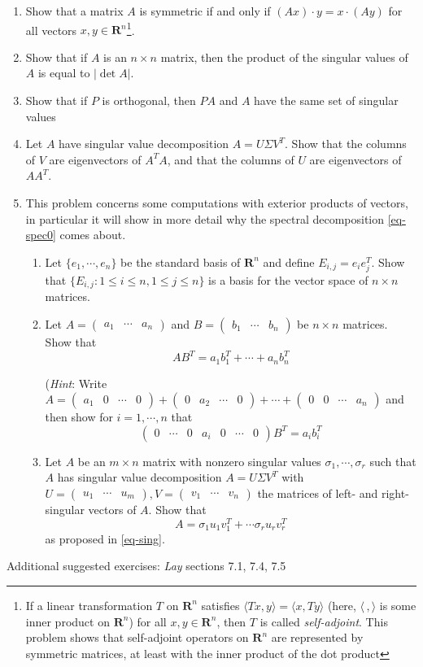 \documentclass[12pt]{article}
\numberwithin{equation}{subsection}
\numberwithin{figure}{subsection}
\theoremstyle{note}
\newcommand{\R}{\mathbf{R}}
\newcommand\ip[2]{\langle #1, #2\rangle}
\newcommand\m[1]{\begin{pmatrix}#1\end{pmatrix}}
\begin{document}
\begin{enumerate}[label=\arabic*.]
\begin{enumerate}
\end{enumerate}

\item Show that a matrix $A$ is symmetric if and only if $(Ax)\cdot y=x\cdot (Ay)$ for all vectors $x,y\in \R^n$\footnote{If a linear transformation $T$ on $\R^n$ satisfies $\langle Tx,y\rangle=\langle x,Ty\rangle$ (here, $\ip{\,}{}$ is some inner product on $\R^n$) for all $x,y\in \R^n$, then $T$ is called \textit{self-adjoint}. This problem shows that self-adjoint operators on $\R^n$ are represented by symmetric matrices, at least with the inner product of the dot product}.
\item Show that if $A$ is an $n\times n$ matrix, then the product of the singular values of $A$ is equal to $|\det A|$.

\item Show that if $P$ is orthogonal, then $PA$ and $A$ have the same set of singular values

\item Let $A$ have singular value decomposition $A=U\Sigma V^T$. Show that the columns of $V$ are eigenvectors of $A^TA$, and that the columns of $U$ are eigenvectors of $AA^T$. 




\item This problem concerns some computations with exterior products of vectors, in particular it will show in more detail why the spectral decomposition \eqref{eq-spec0} comes about.
\begin{enumerate}
\item Let $\{e_1,\cdots,e_n\}$ be the standard basis of $\R^n$ and define $E_{i,j}=e_ie_j^T$. Show that $\{ E_{i,j} : 1\leq i\leq n, 1\leq j\leq n\}$ is a basis for the vector space of $n\times n$ matrices. 
\item Let $A=\m{a_1 & \cdots & a_n}$ and $B=\m{b_1 & \cdots & b_n}$ be $n\times n$ matrices. Show that \begin{equation} AB^T=a_1b_1^T + \cdots + a_nb_n^T \end{equation}

(\textit{Hint}: Write $A=\m{a_1 & 0 & \cdots & 0}+\m{0 & a_2 & \cdots & 0}+\cdots+\m{0 & 0 & \cdots & a_n}$ and then show for $i=1,\cdots,n$ that \[ \m{0 & \cdots & 0 & a_i & 0 & \cdots & 0} B^T=a_ib_i^T\]


\item Let $A$ be an $m\times n$ matrix with nonzero singular values $\sigma_1,\cdots,\sigma_r$ such that $A$ has singular value decomposition $A=U\Sigma V^T$ with $U=\m{u_1 & \cdots & u_m}, V=\m{v_1 & \cdots & v_n}$ the matrices of left- and right- singular vectors of $A$. Show that  
	\[A=\sigma_1 u_1v_1^T+\cdots \sigma_r u_r v_r^T\]
	as proposed in \eqref{eq-sing}.
\end{enumerate}
\end{enumerate}
Additional suggested exercises: \textit{Lay} sections 7.1, 7.4, 7.5
\end{document}
